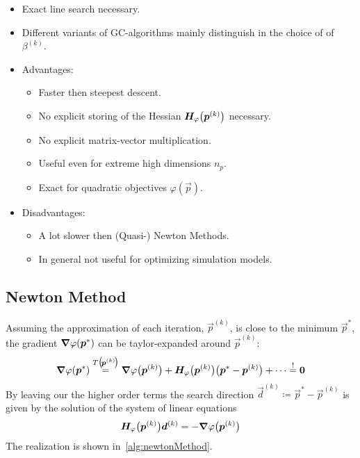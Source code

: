 			\begin{itemize}
				\item Exact line search necessary.
				\item Different variants of GC-algorithms mainly distinguish in the choice of of \( \beta^{(k)} \).
				\item Advantages:
					\begin{itemize}
						\item Faster then steepest descent.
						\item No explicit storing of the Hessian \( \bm{H}_\varphi\big(\bm{p}^{(k)}\big) \) necessary.
						\item No explicit matrix-vector multiplication.
						\item Useful even for extreme high dimensions \( n_p \).
						\item Exact for quadratic objectives \( \varphi(\vec{p}) \).
					\end{itemize}
				\item Disadvantages:
					\begin{itemize}
						\item A lot slower then (Quasi-) Newton Methods.
						\item In general not useful for optimizing simulation models.
					\end{itemize}
			\end{itemize}

		\subsection{Newton Method}
			Assuming the approximation of each iteration, \( \vec{p}^{(k)} \), is close to the minimum \( \vec{p}^\ast \), the gradient \( \grad{\varphi}(\bm{p}^\ast) \) can be taylor-expanded around \( \vec{p}^{(k)} \):
			\begin{align*}
				\grad{\varphi}(\bm{p}^\ast) \overset{T\big(\!\bm{p}^{(k)}\!\big)}{=} \grad{\varphi}\big(\bm{p}^{(k)}\big) + \bm{H}_\varphi\big(\bm{p}^{(k)}\big) \big( \bm{p}^\ast - \bm{p}^{(k)} \big) + \cdots \overset{!}{=} \bm{0}
			\end{align*}
			By leaving our the higher order terms the search direction \( \vec{d}^{(k)} \coloneqq \vec{p}^\ast - \vec{p}^{(k)} \) is given by the solution of the system of linear equations
			\begin{align*}
				\bm{H}_\varphi\big(\bm{p}^{(k)}\big) \bm{d}^{(k)} = -\grad{\varphi}\big(\bm{p}^{(k)}\big)
			\end{align*}
			The realization is shown in~\autoref{alg:newtonMethod}.

